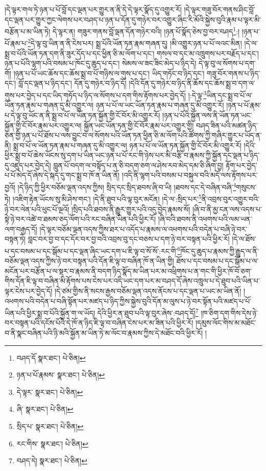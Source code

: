 །དེ་ལྟར་གལ་ཏེ་ཉན་པ་པོ་བློ་དང་ལྡན་པར་གྱུར་ན་ནི་དེ་དེ་ལྟར་སྣོད་དུ་འགྱུར་རོ། །དེ་ལྟར་གཟུ་བོར་གནས་ཤིང་བློ་དང་ལྡན་པར་གྱུར་ཀྱང་ལེགས་པར་བཤད་པ་ཉན་པ་དོན་དུ་གཉེར་བར་འགྱུར་ཞིང་རི་མོའི་སྐྱེས་བུའི་རྣམ་པ་ལྟར་མི་བརྩོན་པ་མ་ཡིན་ཏེ། དེ་ལྟར་ན། གཟུར་གནས་བློ་ལྡན་དོན་གཉེར་བའི། །ཉན་པོ་སྣོད་ཅེས་བྱ་བར་བཤད\footnote{བཤད་དོ  སྣར་ཐང་།  པེ་ཅིན། }:། །ཉན་པ་པོ་རྣམ་པ་\footnote{ཉན་པ་པོ་རྣམས་  སྣར་ཐང་།  པེ་ཅིན། }དེ་ལྟ་བུ་ཡིན་ན་ནི་ངེས་པར། སྨྲ་པོའི་ཡོན་ཏན་རྣམ་གཞན་དུ། །མི་འགྱུར་ཉན་པ་པོ་ལའང་མིན། །དེ་ལ་སྨྲ་བ་པོའི་ཡོན་ཏན་དག་ནི་ཟུར་དོད་པ་དང་ཕྱིན་ཅི་མ་ལོག་པ་དང་། གསལ་བ་དང་མ་འཁྲུགས་པར་བརྗོད་པ་དང་། ཉན་པ་པོའི་ལྷག་པའི་བསམ་པ་ཁོང་དུ་ཆུད་པ་དང་། སེམས་ལ་ཟང་ཟིང་མེད་པ་ཉིད་དེ། དེ་ལྟ་བུ་ལ་སོགས་པ་དག་གོ། །ཉན་པ་པོ་ཡང་ཆོས་དང་ཆོས་སྨྲ་བ་པོ་གཉིས་ལ་གུས་པ་དང་། ཡིད་གཏོང་བ་ཉིད་དང་། གཟུ་བོར་གནས་པ་ཉིད་དང་། བློ་དང་ལྡན་པ་ཉིད་དང་། དོན་དུ་གཉེར་བ་ཉིད་དོ། །དེའི་དོན་དུ་གཉེར་བ་ཉིད་ནི་ཆོས་དང་ཆོས་སྨྲ་བ་དག་ལ་གུས་པར་བྱེད་པ་དང་ཡིད་གཏོད་པ་ཉིད་ལ་སོགས་པ་དག་གིས་རྟོགས་པར་བྱེད་དོ། །:དེ་ལྟ་\footnote{དེ་ལྟར་  སྣར་ཐང་།  པེ་ཅིན། }ཡིན་དང་སྨྲ་བ་པོ་ལ་ཡོན་ཏན་རྣམ་པ་གཞན་དུ་མི་འགྱུར་ལ། ཉན་པ་པོ་ལ་ཡང་ཡོན་ཏན་རྣམ་པ་གཞན་དུ་མི་འགྱུར་རོ། །ཉན་པ་པོ་རྣམ་པ་དེ་ལྟ་བུ་ཡོང་ན་ནི་སྨྲ་བ་པོ་ལ་ཡོན་ཏན་སྐྱོན་གྱི་ངོ་བོར་མི་འགྱུར་རོ། །ཉན་པ་པོའི་སྐྱོན་ལས་ནི་ཡོན་ཏན་ཡང་སྐྱོན་གྱི་ངོ་བོར་རྣམ་པར་འགྱུར་ལ། སྐྱོན་ཡང་ཡོན་ཏན་གྱི་ངོ་བོར་རྣམ་པར་འགྱུར་གྱི། བཤད་ཟིན་པའི་མཚན་ཉིད་ཅན་གྱི་ཉན་པ་པོ་ཐོས་པ་ལས་བྱུང་བ་ལ་སོགས་པའི་ཡོན་ཏན་ཕྱིན་ཅི་མ་ལོག་པའི་ཚོགས་ཀྱི་གཞིར་གྱུར་པ་ཡོད་ན་ནི། སྨྲ་བ་པོ་ལ་ཡོན་ཏན་རྣམ་པ་གཞན་དུ་མི་འགྱུར་ལ། ཉན་པ་པོ་ལ་ཡོན་ཏན་སྐྱོན་གྱི་ངོ་བོར་མི་འགྱུར་རོ། །དེའི་ཕྱིར་སྨྲ་བ་པོ་ཆེས་ཡོངས་སུ་དག་པ་ཡིན་ཡང་ཉན་པ་པོ་རང་གི་ཉེས་པར་མི་བརྩི་བ་རྣམས་ཀྱི་སྐྱོན་དང་ལྡན་པ་ཉིད་དུ་འཛུད་པར་བྱེད་དེ། བླུན་པོ་བདག་ལ་བསྟོད་པ་ན་ཅི་བདག་ཅག་ལ་ཤེས་རབ་མེད་དམ་ཅི་ཞིག་བྱ། རྟོག་པར་བྱེད་པ་པོ་མེད་དོ་ཞེས་དེ་སྐད་དུ་གང་སྨྲ་བ་ཁོ་ན་ཡིན་ནོ། །འདི་ནི་ལྷག་པའི་བསམ་པ་བསྐུལ་བའི་མདོ་ལས་རྟོགས་པར་བྱའོ། །དེ་ཉིད་ཀྱི་ཕྱིར་བཅོམ་ལྡན་འདས་ཀྱིས། སྲིད་དང་སྲིད་ཐབས་ཞི་བ་ཡི། །ཐབས་དང་དེ་བཞིན་བཞི་\footnote{ཞི་  སྣར་ཐང་།  པེ་ཅིན། }གསུངས་ཏེ། །འཇིག་རྟེན་ཡོངས་སུ་མི་ཤེས་གང་། །དེ་ནི་ཐུབ་པའི་ལྟ་བུར་མངོན། །དེ་ལ་:སྲིད་པར་\footnote{སྲིད་པ་  སྣར་ཐང་།  པེ་ཅིན། }ནི་འབྲས་བུར་འགྱུར་བའི་ཉེ་བར་ལེན་པའི་ཕུང་པོ་ལྔའོ། །སྲིད་པའི་ཐབས་ནི་རྒྱུར་གྱུར་པའི་འདུ་བྱེད་རྣམས་སོ། །ཞི་བ་ནི་མྱ་ངན་ལས་འདས་པ་སྟེ་ཉེ་བར་འཚེ་བ་ཐམས་ཅད་ལོག་པའི་རང་བཞིན་ཡིན་པའི་ཕྱིར་རོ། །ཞི་བའི་ཐབས་ནི་འཕགས་པའི་ལམ་ཡན་ལག་བརྒྱད་དོ། །དེ་ལྟར་བཅོམ་ལྡན་འདས་ཀྱིས་ཐར་པ་འདོད་པ་རྣམས་ལ་འཕགས་པའི་བདེན་པ་བཞི་ཉེ་བར་བསྟན་ཏེ། བླང་བར་བྱ་བ་དང་དོར་བར་བྱ་བའི་འབྲས་བུ་དང་བཅས་པ་དག་ཉེ་བར་བསྟན་པའི་ཕྱིར་རོ། །དེ་ལ་ཐོས་པ་དང་བསམ་པ་དང་སྒོམ་པ་དང་ལྡན་ཞིང་ཡང་དག་པ་ཇི་ལྟ་བ་སོ་སོ་:རང་གི་\footnote{རང་གིས་  སྣར་ཐང་།  པེ་ཅིན། }ཁོང་དུ་ཆུད་པ་རྣམས་ཀྱི་རྒྱུད་ལ་ནི་བཅོམ་ལྡན་འདས་ཀྱིས་ཉེ་བར་བསྟན་པའི་དོན་ཇི་ལྟ་བ་བཞིན་ཁོ་ན་ཡིན་གྱི། ཐོས་པ་དང་བསམ་པ་དང་སྒོམ་པ་ལ་མངོན་པར་བརྩོན་པ་ལ་སྡར་བ་རྣམས་ནི་བདག་ཉིད་སྣོད་མ་ཡིན་པར་མ་འཕྲིགས་པ་ན་གང་གི་ཕྱིར་ཁོ་བོ་ཅག་གིས་དོན་ཇི་ལྟ་བ་བཞིན་མི་རྟོགས་པས་ངེས་པར་འདི་ཡང་དག་པར་མ་བཤད་དོ་ཞེས་འཁྲུལ་པ་དེ་ཐུབ་པའི་ཡིན་པ་ལྟར་ངེས་པར་བྱེད་དོ། །དེ་ཙམ་གྱིས་ནི་སངས་རྒྱས་བཅོམ་ལྡན་འདས་ནོངས་པ་དང་ལྡན་པ་ཡང་མ་ཡིན་ནོ། །འཕགས་པའི་བདེན་པ་བཞི་སྟོན་པར་མཛད་པ་ཉིད་ཀྱིས་སྐྱེས་བུའི་དོན་མ་ལུས་པ་ཉེ་བར་སྟོན་པའི་མཛད་པ་པོ་ཡིན་པའི་ཕྱིར་སྨྲ་བ་པོའི་སྐྱོན་ག་ལ་ཡོད། དེའི་ཕྱིར་ན་ཐུབ་པའི་ལྟ་བུར་ཞེས་:བཤད་དོ།\footnote{བཤད་དེ།  སྣར་ཐང་།  པེ་ཅིན། } །ཁ་ཅིག་དག་གིས་དེས་ཉེ་བར་བསྟན་པའི་དངོས་པོའི་དེ་ཁོ་ན་ཉིད་ཇི་ལྟ་བ་བཞིན་ངེས་པར་མ་ཟིན་པའི་ཕྱིར་རོ། །དམུས་ལོང་གིས་མ་མཐོང་བ་ནི་སྣང་བཞིན་པའི་ཉི་མའི་སྐྱོན་མ་ཡིན་ཏེ་མ་ལོང་བ་རྣམས་ཀྱིས་དེ་མཐོང་བའི་ཕྱིར་རོ། །

